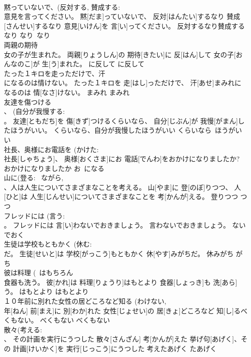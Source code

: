 \documentclass[8pt]{extreport}
\begin{document}
\begin{CJK}{UTF8}{min}
\\	黙っていないで、(反対する, 賛成する: 
\\	意見を言ってください。	黙[だま]っていないで、 反対[はんたい]するなり 賛成[さんせい]するなり 意見[いけん]を 言[い]ってください。	反対するなり賛成するなり	なり~なり	
\\	両親の期待 
\\	女の子が生まれた。	両親[りょうしん]の 期待[きたい]に 反[はん]して 女の子[おんなのこ]が 生[う]まれた。	に反して	に反して	
\\	たった１キロを走っただけで、汗 
\\	になるのは情けない。	たった１キロを 走[はし]っただけで、 汗[あせ]まみれになるのは 情[なさ]けない。	まみれ	まみれ	
\\	友達を傷つける 
\\	、 (自分が我慢する: 
\\	。	友達[ともだち]を 傷[きず]つけるくらいなら、 自分[じぶん]が 我慢[がまん]したほうがいい。	くらいなら、自分が我慢したほうがいい	くらいなら~ほうがいい	
\\	社長、奥様にお電話を (かけた: 
\\	社長[しゃちょう]、 奥様[おくさま]にお 電話[でんわ]をおかけになりましたか?	おかけになりましたか	お~になる	
\\	山に(登る: ~ながら, 
\\	、人は人生についてさまざまなことを考える。	山[やま]に 登[のぼ]りつつ、 人[ひと]は 人生[じんせい]についてさまざまなことを 考[かんが]える。	登りつつ	つつ	
\\	フレッドには (言う: 
\\	。	フレッドには 言[い]わないでおきましょう。	言わないでおきましょう。	ないでおく	
\\	生徒は学校もともかく (休む: 
\\	だ。	生徒[せいと]は 学校[がっこう]もともかく 休[やす]みがちだ。	休みがち	がち	
\\	彼は料理 (~はもちろん 
\\	食器も洗う。	彼[かれ]は 料理[りょうり]はもとより 食器[しょっき]も 洗[あら]う。	はもとより	はもとより	
\\	１０年前に別れた女性の居どころなど知る (わけない, 
\\	年[ねん] 前[まえ]に 別[わか]れた 女性[じょせい]の 居[きょ]どころなど 知[し]るべくもない。	べくもない	べくもない	
\\	散々(考える: 
\\	、 その計画を実行にうつした	散々[さんざん] 考[かんが]えた 挙げ句[あげく]、その 計画[けいかく]を 実行[じっこう]にうつした	考えたあげく	たあげく	

\end{CJK}
\end{document}
